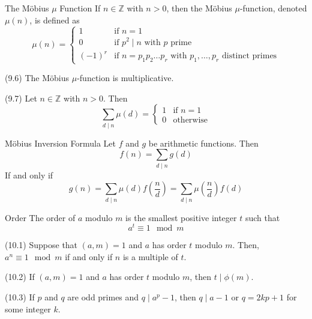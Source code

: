 \documentclass[12pt]{article}
\begin{document}
\begin{definition}{The Möbius $ \mu $ Function}{}
    If $ n \in \mathbb{Z} $ with $ n > 0 $, then the Möbius $ \mu $-function, denoted $ \mu \left( n \right) $, is defined as
    \[ \mu \left( n \right) = \begin{cases}
        1 & \text{if } n = 1 \\
        0 & \text{if } p^2 \mid n \text{ with } p \text{ prime} \\
        \left( -1 \right)^r & \text{if } n = p_1 p_2 \dots p_r \text{ with } p_1, \dots, p_r \text{ distinct primes}
    \end{cases} \]
\end{definition}
\begin{theorem}{(9.6)}{}
    The Möbius $ \mu $-function is multiplicative.
\end{theorem}
\begin{corollary}{(9.7)}{}
    Let $ n \in \mathbb{Z} $ with $ n > 0 $. Then
    \[ \sum_{d \mid n} \mu \left( d \right) = \begin{cases}
        1 & \text{if } n = 1 \\
        0 & \text{otherwise}
    \end{cases} \]
\end{corollary}
\begin{theorem}{Möbius Inversion Formula}{}
    Let $ f $ and $ g $ be arithmetic functions. Then
    \[ f \left( n \right) = \sum_{d \mid n} g \left( d \right) \]
    If and only if
    \[ g \left( n \right) = \sum_{d \mid n} \mu \left( d \right) f \left( \frac{n}{d} \right) = \sum_{d \mid n} \mu \left( \frac{n}{d} \right) f \left( d \right) \]
\end{theorem}
\begin{definition}{Order}{}
    The order of $ a $ modulo $ m $ is the smallest positive integer $ t $ such that
    \[ a^t \equiv 1 \mod m \]
\end{definition}
\begin{theorem}{(10.1)}{}
    Suppose that $ \left( a, m \right) = 1 $ and $ a $ has order $ t $ modulo $ m $. Then, $ a^n \equiv 1 \mod m $ if and only if $ n $ is a multiple of $ t $.
\end{theorem}
\begin{theorem}{(10.2)}{}
    If $ \left( a, m \right) = 1 $ and $ a $ has order $ t $ modulo $ m $, then $ t \mid \phi \left( m \right) $.
\end{theorem}
\begin{theorem}{(10.3)}{}
    If $ p $ and $ q $ are odd primes and $ q \mid a^p - 1 $, then $ q \mid a - 1 $ or $ q = 2kp + 1 $ for some integer $ k $.
\end{theorem}
\end{document}
